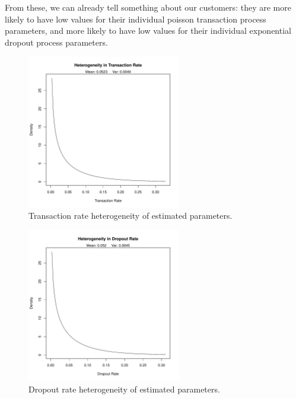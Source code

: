 \documentclass[10pt, letterpaper, onecolumn, oneside, final]{article}\usepackage[]{graphicx}\usepackage[]{color}
\begin{document}
From these, we can already tell something about our customers: they
are more likely to have low values for their individual poisson
transaction process parameters, and more likely to have low values for
their individual exponential dropout process parameters.



\begin{figure}
  \begin{center}
  \includegraphics[width=0.6\textwidth]{figure/pnbdTransactionHeterogeneity}
  \caption{Transaction rate heterogeneity of estimated parameters.}\label{fig:pnbdTransactionHeterogeneity}
  \end{center}
\end{figure}



\begin{figure}
  \begin{center}
  \includegraphics[width=0.6\textwidth]{figure/pnbdDropoutHeterogeneity}
  \caption{Dropout rate heterogeneity of estimated parameters.}\label{fig:pnbdDropoutHeterogeneity}
  \end{center}
\end{figure}
 
\end{document}
